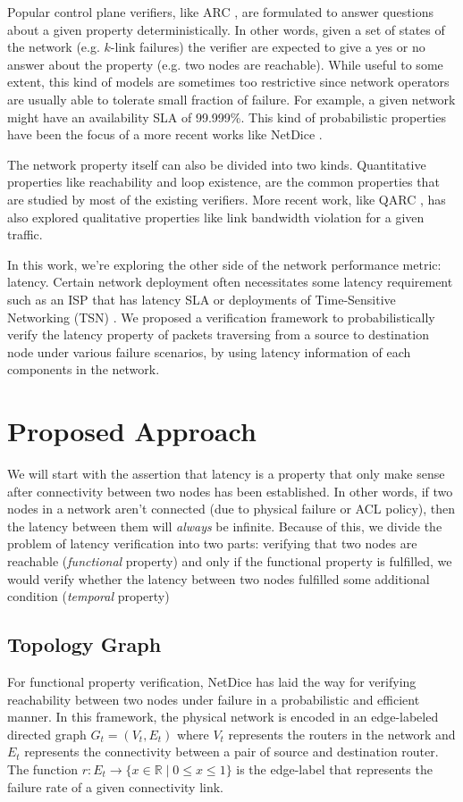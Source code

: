 \documentclass[10pt,sigconf,letterpaper,anonymous,nonacm]{acmart}
\begin{document}
Popular control plane verifiers, like ARC \cite{gember2016fast}, are formulated to answer 
questions about a given property deterministically. 
In other words, given a set of states of the network (e.g. $k$-link failures) the verifier are 
expected to give a yes or no answer about the property (e.g. two nodes are reachable).
While useful to some extent, this kind of models are sometimes too restrictive since network 
operators are usually able to tolerate small fraction of failure. 
For example, a given network might have an availability SLA of 99.999\%. 
This kind of probabilistic properties have been the focus of a more recent works like NetDice 
\cite{steffen2020probabilistic}.

The network property itself can also be divided into two kinds. 
Quantitative properties like reachability and loop existence, are the common properties that are 
studied by most of the existing verifiers. 
More recent work, like QARC \cite{subramanian2020detecting}, has also explored qualitative 
properties like link bandwidth violation for a given traffic.

In this work, we're exploring the other side of the network performance metric: latency. 
Certain network deployment often necessitates some latency requirement such as an ISP that has 
latency SLA \cite{Verizon} or deployments of Time-Sensitive Networking (TSN) \cite{TSN}.
We proposed a verification framework to probabilistically verify the latency property of packets 
traversing from a source to destination node under various failure scenarios, by using latency 
information of each components in the network.

\section{Proposed Approach}
We will start with the assertion that latency is a property that only make sense 
after connectivity between two nodes has been established. 
In other words, if two nodes in a network aren't connected (due to physical failure 
or ACL policy), then the latency between them will \textit{always} be infinite.
Because of this, we divide the problem of latency verification into two parts: 
verifying that two nodes are reachable (\textit{functional} property) and only if 
the functional property is fulfilled, we would verify whether the latency between 
two nodes fulfilled some additional condition (\textit{temporal} property)

\subsection{Topology Graph}
For functional property verification, NetDice \cite{steffen2020probabilistic} 
has laid the way for verifying reachability between two nodes under failure in a 
probabilistic and efficient manner. 
In this framework, the physical network is encoded in an edge-labeled directed graph 
$G_t = (V_t, E_t)$ where $V_t$ represents the routers in the network and 
$E_t$ represents the connectivity between a pair of source and destination router. 
The function $r: E_t \rightarrow \{x \in \mathbb{R} \mid 0 \le x \le 1\}$ is the 
edge-label that represents the failure rate of a given connectivity link.
\end{document}
